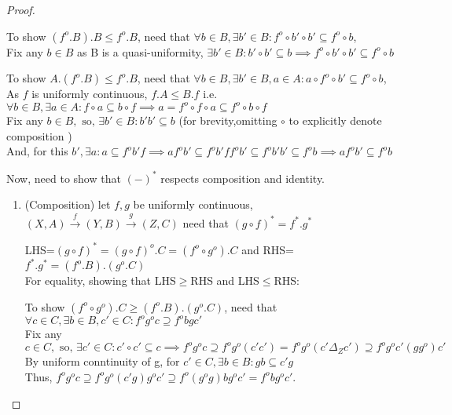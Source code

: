 \documentclass[18pt,a4paper]{article}
\theoremstyle{definition}
\begin{document}
\begin{proof}
\begin{enumerate}[label=(\roman*)]
	\end{enumerate}
\item
	To show $(f^o .B).B \leq f^o .B$, need that $\forall b \in B,
	\exists b' \in B : f^o \circ b' \circ b' \subseteq f^o \circ b$,\\
	Fix any $b \in B$ as B is a quasi-uniformity, $\exists b' \in B : b' \circ b' \subseteq b
	\implies f^o \circ b'\circ b' \subseteq f^o \circ b$

	To show $A.(f^o .B) \leq f^o .B$, need that $\forall b \in B,
	\exists b' \in B, a\in A : a \circ f^o \circ b' \subseteq f^o \circ b$,\\
	As $f$ is uniformly continuous, $f.A\leq B.f$ i.e. $\forall b \in B, \exists a \in A
	: f \circ a \subseteq b \circ f
	\implies a= f^o \circ f \circ a \subseteq f^o \circ  b \circ f $   \\
	Fix any $b \in B, \text{ so, } \exists b' \in B : b'b' \subseteq b$
	(for brevity,omitting $\circ$ to explicitly denote composition  )\\
	And, for this $b', \exists a : a \subseteq f^ob'f \implies af^ob' \subseteq f^ob'ff^ob'
	\subseteq f^o b'b' \subseteq f^o b \implies af^ob' \subseteq f^o b$\\
\item
	Now, need to show that $(-)^*$ respects composition and identity.
	\begin{enumerate}[label=(\roman*)]
		\item (Composition) let $f,g$ be uniformly continuous,
			$(X,A) \xrightarrow{f} (Y,B) \xrightarrow{g} (Z,C)$
			need that $(g \circ f)^*= f^*.g^* $

			LHS=$(g \circ f)^*=(g \circ f)^o .C=(f^o \circ g^o).C$ and
			RHS=$f^*.g^* =(f^o .B).(g^o .C)$\\
			For equality, showing that LHS$\geq$RHS and LHS$\leq$RHS:

			To show $(f^o \circ g^o).C\geq(f^o .B).(g^o .C)$, need that
			$\forall c \in C, \exists b \in B, c' \in C : f^og^oc
			\supseteq f^obgc'$ \\
			Fix any $c \in C, \text{ so, } \exists c' \in C: c' \circ c' \subseteq c
			\implies f^o g^o c \supseteq f^o g^o (c'c')
			=f^o g^o (c' \Delta_Z c') \supseteq f^o g^o c'(gg^o)c'$ \\
			By uniform conntinuity of g, for $c'\in C,\exists b\in B: gb\subseteq c'g $
			\\Thus, $f^o g^o c \supseteq f^o g^o (c'g)g^oc' \supseteq
			f^o (g^o g)bg^o c'=f^o bg^o c'$.


\end{enumerate}
\end{proof}
\end{document}

